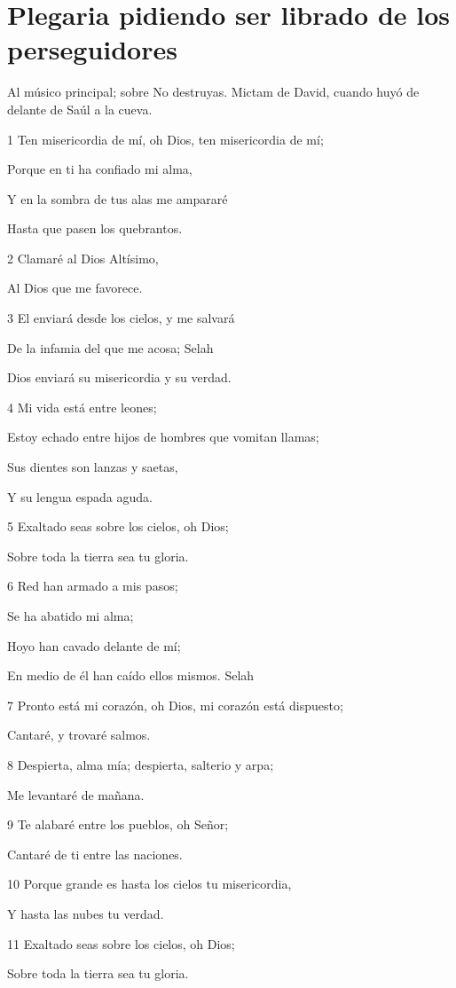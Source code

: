 \section*{Plegaria pidiendo ser librado de los perseguidores}

\par Al músico principal; sobre No destruyas. Mictam de David, cuando huyó de delante de Saúl a la cueva.

\par 1 Ten misericordia de mí, oh Dios, ten misericordia de mí;
\par Porque en ti ha confiado mi alma,
\par Y en la sombra de tus alas me ampararé
\par Hasta que pasen los quebrantos.
\par 2 Clamaré al Dios Altísimo,
\par Al Dios que me favorece.
\par 3 El enviará desde los cielos, y me salvará
\par De la infamia del que me acosa; Selah
\par Dios enviará su misericordia y su verdad.
\par 4 Mi vida está entre leones;
\par Estoy echado entre hijos de hombres que vomitan llamas;
\par Sus dientes son lanzas y saetas,
\par Y su lengua espada aguda.
\par 5 Exaltado seas sobre los cielos, oh Dios;
\par Sobre toda la tierra sea tu gloria.
\par 6 Red han armado a mis pasos;
\par Se ha abatido mi alma;
\par Hoyo han cavado delante de mí;
\par En medio de él han caído ellos mismos. Selah
\par 7 Pronto está mi corazón, oh Dios, mi corazón está dispuesto;
\par Cantaré, y trovaré salmos.
\par 8 Despierta, alma mía; despierta, salterio y arpa;
\par Me levantaré de mañana.
\par 9 Te alabaré entre los pueblos, oh Señor;
\par Cantaré de ti entre las naciones.
\par 10 Porque grande es hasta los cielos tu misericordia,
\par Y hasta las nubes tu verdad.
\par 11 Exaltado seas sobre los cielos, oh Dios;
\par Sobre toda la tierra sea tu gloria.

